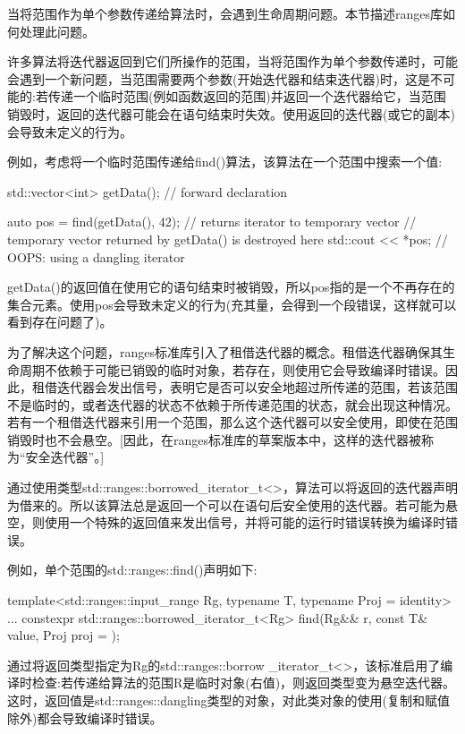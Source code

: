 

当将范围作为单个参数传递给算法时，会遇到生命周期问题。本节描述ranges库如何处理此问题。


许多算法将迭代器返回到它们所操作的范围，当将范围作为单个参数传递时，可能会遇到一个新问题，当范围需要两个参数(开始迭代器和结束迭代器)时，这是不可能的:若传递一个临时范围(例如函数返回的范围)并返回一个迭代器给它，当范围销毁时，返回的迭代器可能会在语句结束时失效。使用返回的迭代器(或它的副本)会导致未定义的行为。

例如，考虑将一个临时范围传递给find()算法，该算法在一个范围中搜索一个值:

\begin{cpp}
std::vector<int> getData(); // forward declaration

auto pos = find(getData(), 42); // returns iterator to temporary vector
// temporary vector returned by getData() is destroyed here
std::cout << *pos; // OOPS: using a dangling iterator
\end{cpp}

getData()的返回值在使用它的语句结束时被销毁，所以pos指的是一个不再存在的集合元素。使用pos会导致未定义的行为(充其量，会得到一个段错误，这样就可以看到存在问题了)。

为了解决这个问题，ranges标准库引入了租借迭代器的概念。租借迭代器确保其生命周期不依赖于可能已销毁的临时对象，若存在，则使用它会导致编译时错误。因此，租借迭代器会发出信号，表明它是否可以安全地超过所传递的范围，若该范围不是临时的，或者迭代器的状态不依赖于所传递范围的状态，就会出现这种情况。若有一个租借迭代器来引用一个范围，那么这个迭代器可以安全使用，即使在范围销毁时也不会悬空。[因此，在ranges标准库的草案版本中，这样的迭代器被称为“安全迭代器”。]

通过使用类型std::ranges::borrowed\_iterator\_t<>，算法可以将返回的迭代器声明为借来的。所以该算法总是返回一个可以在语句后安全使用的迭代器。若可能为悬空，则使用一个特殊的返回值来发出信号，并将可能的运行时错误转换为编译时错误。

例如，单个范围的std::ranges::find()声明如下:

\begin{cpp}
template<std::ranges::input_range Rg,
			typename T,
			typename Proj = identity>
...
constexpr std::ranges::borrowed_iterator_t<Rg>
	find(Rg&& r, const T& value, Proj proj = {});
\end{cpp}

通过将返回类型指定为Rg的std::ranges::borrow \_iterator\_t<>，该标准启用了编译时检查:若传递给算法的范围R是临时对象(右值)，则返回类型变为悬空迭代器。这时，返回值是std::ranges::dangling类型的对象，对此类对象的使用(复制和赋值除外)都会导致编译时错误。


